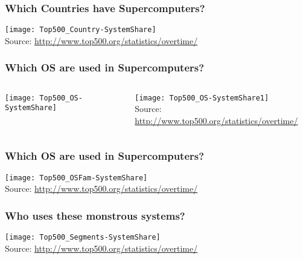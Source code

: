 \documentclass[slidestop,mathserif,compress,xcolor=svgnames,table]{beamer}
\begin{document}
\begin{frame}
  \frametitle{\small Which Countries have Supercomputers?}
  \vspace{-0.5cm}
  \begin{center}
    \texttt{[image: Top500\_Country-SystemShare]}\\
    {\tiny Source: \url{http://www.top500.org/statistics/overtime/}}
  \end{center}
\end{frame}

\begin{frame}
  \frametitle{\small Which OS are used in Supercomputers?}
  \begin{columns}
    \vspace{-1cm}
    \begin{center}
      \texttt{[image: Top500\_OS-SystemShare]}
    \end{center}
    \vspace{0.5cm}
    \begin{center}
      \hspace{-1cm}
      \texttt{[image: Top500\_OS-SystemShare1]}\\
      {\tiny Source: \url{http://www.top500.org/statistics/overtime/}}
    \end{center}
  \end{columns}
\end{frame}

\begin{frame}
  \frametitle{\small Which OS are used in Supercomputers?}
  \vspace{-0.5cm}
  \begin{center}
    \texttt{[image: Top500\_OSFam-SystemShare]}\\
    {\tiny Source: \url{http://www.top500.org/statistics/overtime/}}
  \end{center}
\end{frame}

\begin{frame}
  \frametitle{\small Who uses these monstrous systems?}
  \vspace{-0.5cm}
  \begin{center}
    \texttt{[image: Top500\_Segments-SystemShare]}\\
    {\tiny Source: \url{http://www.top500.org/statistics/overtime/}}
  \end{center}
\end{frame}
\end{document}

